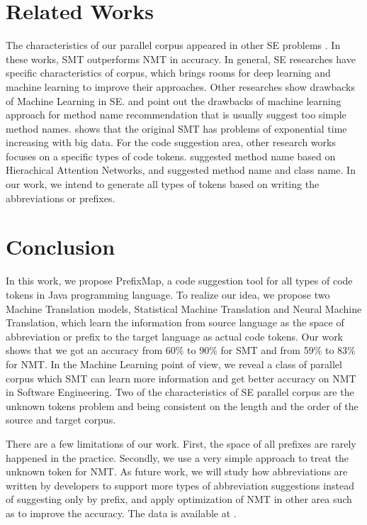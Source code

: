 
\section*{Related Works}

The characteristics of our parallel corpus appeared in other SE problems \cite{027,028}. In these works, SMT outperforms NMT in accuracy. In general, SE researches have specific characteristics of corpus, which brings rooms for deep learning and machine learning to  improve their approaches. Other researches show drawbacks of Machine Learning in SE. \cite{050} and point out the drawbacks of machine learning approach for method name recommendation that is usually suggest too simple method names. \cite{022} shows that the original SMT has problems of exponential time increasing with big data. For the code suggestion area, other research works focuses on a specific types of code tokens. \cite{051} suggested method name based on Hierachical Attention Networks, and \cite{052} suggested method name and class name. In our work, we intend to generate all types of tokens based on writing the abbreviations or prefixes. 


\section*{Conclusion}
In this work, we propose PrefixMap, a code suggestion tool for all types of code tokens in Java programming language. To realize our idea, we propose two Machine Translation models, Statistical Machine Translation and Neural Machine Translation, which learn the information from source language as the space of abbreviation or prefix to the target language as actual code tokens. Our work shows that we got an accuracy from 60\% to 90\% for SMT and from 59\% to 83\% for NMT. In the Machine Learning point of view, we reveal a class of parallel corpus which SMT can learn more information and get better accuracy on NMT in Software Engineering. Two of the characteristics of SE parallel corpus are the unknown tokens problem and being consistent on the length and the order of the source and target corpus. 

There are a few limitations of our work. First, the space of all prefixes are rarely happened in the practice. Secondly, we use a very simple approach to treat the unknown token for NMT. As future work, we will study how abbreviations are written by developers to support more types of abbreviation suggestions instead of suggesting only by prefix, and apply optimization of NMT in other area such as \cite{023} to improve the accuracy. The data is available at \cite{053}.
